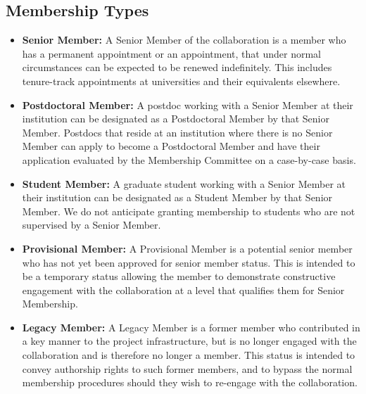\subsection{Membership Types}

\begin{itemize}


\item {\bf Senior Member:} A Senior Member of the collaboration is a member who has a permanent appointment or an appointment, that under normal circumstances can be expected to be renewed indefinitely.   This includes tenure-track appointments at universities and their equivalents elsewhere.  

\item {\bf Postdoctoral Member:} A postdoc working with a Senior Member at their institution can be designated as a Postdoctoral Member by that Senior Member.  Postdocs that reside at an institution where there is no Senior Member can apply to become a Postdoctoral Member and have their application evaluated by the Membership Committee on a case-by-case basis. 

\item {\bf Student Member:} A graduate student working with a Senior Member at their institution can be designated as a Student Member by that Senior Member.  We do not anticipate granting membership to students who are not supervised by a Senior Member.

\item {\bf Provisional Member:}  A Provisional Member is a potential senior member who has not yet been approved for senior member status.  This is intended to be a temporary status allowing the member to demonstrate constructive engagement with the collaboration at a level that qualifies them for Senior Membership.

\item {\bf Legacy Member:}  A Legacy Member is a former member who contributed in a key manner to the project infrastructure, but is no longer engaged with the collaboration and is therefore no longer a member.  This status is intended to convey authorship rights to such former members, and to bypass the normal membership procedures should they wish to re-engage with the collaboration.

\end{itemize}

